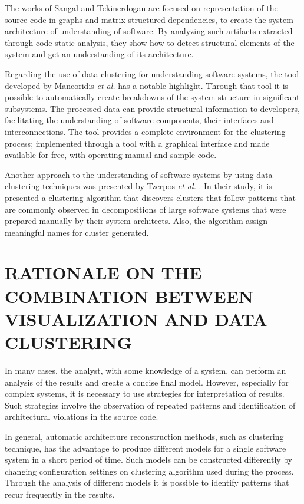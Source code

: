 \documentclass{sig-alternate-05-2015}
\begin{document}
The works of Sangal \cite{Sangal_2005} and Tekinerdogan \cite{Tekinerdogan_2009}  are focused on representation of the source code in graphs and matrix structured dependencies, to create the system architecture of understanding of software. By analyzing such artifacts extracted through code static analysis, they show how to detect structural elements of the system and get an understanding of its architecture.

Regarding the use of data clustering for understanding software systems, the tool developed by Mancoridis \textit {et al.} \cite {Mancoridis_1999}  has a notable highlight. Through that tool it is possible to automatically create breakdowns of the system structure in significant subsystems. The processed data can provide structural information to developers, facilitating the understanding of software components, their interfaces and interconnections. The tool provides a complete environment for the clustering process; implemented through a tool with a graphical interface and made available for free, with operating manual and sample code.

Another approach to the understanding of software systems by using data clustering techniques was presented by Tzerpos \textit{et al.} \cite {Tzerpos_vassilios}. In their study, it is presented a clustering algorithm that discovers clusters that follow patterns that are commonly observed in decompositions of large software systems that were prepared manually by their system architects.  Also, the algorithm assign meaningful names for cluster generated. 


\section{RATIONALE ON THE COMBINATION BETWEEN VISUALIZATION AND DATA CLUSTERING}%

In many cases, the analyst, with some knowledge of a system, can perform an analysis of the results and create a concise final model. However, especially for complex systems, it is necessary to use strategies for interpretation of results. Such strategies involve the observation of repeated patterns and identification of architectural violations in the source code.

In general, automatic architecture reconstruction methods, such as clustering technique, has the advantage to produce different models for a single software system in a short period of time. Such models can be constructed differently by changing configuration settings on clustering algorithm used during the process. Through the analysis of different models it is possible to identify patterns that recur frequently in the results.
\end{document}
